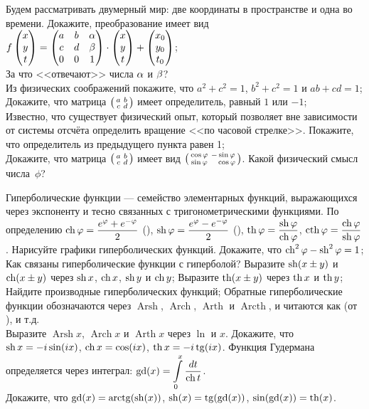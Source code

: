 \documentclass[a4paper,12pt]{article}
\newcommand{\smat}[1]{\hr{\begin{smallmatrix}#1\end{smallmatrix}}}
\newcommand{\мв}{\,м$_в$}
\DeclareMathOperator{\Arsh}{Arsh}
\DeclareMathOperator{\Arch}{Arch}
\DeclareMathOperator{\Arth}{Arth}
\DeclareMathOperator{\Arcth}{Arcth}
\DeclareMathOperator{\gd}{gd}
\begin{document}
\label{3dworld}
Будем рассматривать двумерный мир: две координаты в пространстве и одна во времени.
Докажите, преобразование имеет вид $f\begin{pmatrix}x\\y\\t\end{pmatrix} = \begin{pmatrix}a&b&\alpha\\c&d&\beta\\0&0&1\end{pmatrix}\cdot\begin{pmatrix}x\\y\\t\end{pmatrix}+\begin{pmatrix}x_0\\y_0\\t_0\end{pmatrix}$;
\vspace{-6mm}
\\
За что <<отвечают>> числа $\alpha$ и $\beta$?
\\
Из физических соображений покажите, что
$a^2+c^2=1$,  $b^2+c^2=1$ и $ab+cd=1$;
\\
Докажите, что матрица $\smat{a&b\\c&d}$ имеет определитель, равный $1$ или $-1$;
\\
Известно, что существует  физический опыт, который позволяет вне зависимости от системы отсчёта определить вращение <<по часовой стрелке>>.
Покажите, что определитель из предыдущего пункта равен 1;
\\
Докажите, что матрица $\smat{a&b\\c&d}$ имеет вид $\smat{\cos\phi&-\sin\phi\\\sin\phi&\phantom{-}\cos\phi}$.
Какой физический смысл числа~$\phi$?

Гиперболические функции — семейство элементарных функций, выражающихся через экспоненту и тесно связанных с тригонометрическими функциями.
По определению $\ch \ph = \dfrac{e^\ph + e^{-\ph}}{2}$ (), $\sh \ph = \dfrac{e^\ph - e^{-\ph}}{2}$ (), $\th\ph = \dfrac{\sh\ph}{\ch\ph}$, $\cth{\ph}=\dfrac{\ch\ph}{\sh\ph}$.
Нарисуйте графики гиперболических функций.
Докажите, что $\ch^2\ph - \sh^2\ph = 1$;
Как связаны гиперболические функции с гиперболой?
Выразите $\sh(x\pm y)$ и $\ch(x\pm y)$ через $\sh x$, $\ch x$, $\sh y$ и $\ch y$;
 Выразите $\th(x\pm y)$ через $\th x$ и $\th y$;
Найдите производные гиперболических функций;
Обратные гиперболические функции обозначаются через $\Arsh$, $\Arch$, $\Arth$ и $\Arcth$,
и читаются как  (от ),  и т.д.
\\Выразите $\Arsh x$, $\Arch x$ и $\Arth x$ через $\ln$ и $x$.
Докажите, что $\sh x = -i\sin(ix)$, $\ch x = \cos(ix)$, $\th x = -i\tg(ix)$.
Функция  Гудермана определяется через интеграл: $\displaystyle\gd(x)=\int\limits_0^x \dfrac{dt}{\ch t}$.
\vspace*{-3mm}
\\Докажите, что $\gd(x) = \arctg(\sh(x))$, $\sh(x)=\tg(\gd(x))$, $\sin(\gd(x))=\th(x)$.
\end{document}

